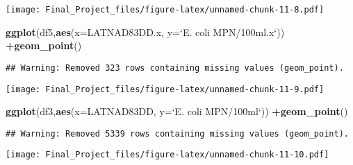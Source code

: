 \documentclass[
]{article}
\newenvironment{Shaded}{\begin{snugshade}}{\end{snugshade}}
\newcommand{\DataTypeTok}[1]{\textcolor[rgb]{0.13,0.29,0.53}{#1}}
\newcommand{\KeywordTok}[1]{\textcolor[rgb]{0.13,0.29,0.53}{\textbf{#1}}}
\newcommand{\NormalTok}[1]{#1}
\newcommand{\OperatorTok}[1]{\textcolor[rgb]{0.81,0.36,0.00}{\textbf{#1}}}
\newcommand{\StringTok}[1]{\textcolor[rgb]{0.31,0.60,0.02}{#1}}
\begin{document}
\texttt{[image: Final\_Project\_files/figure-latex/unnamed-chunk-11-8.pdf]}

\begin{Shaded}
\begin{Highlighting}[]
\KeywordTok{ggplot}\NormalTok{(df5,}\KeywordTok{aes}\NormalTok{(}\DataTypeTok{x=}\NormalTok{LATNAD83DD.x, }\DataTypeTok{y=}\StringTok{`}\DataTypeTok{E. coli MPN/100ml.x}\StringTok{`}\NormalTok{)) }\OperatorTok{+}\KeywordTok{geom_point}\NormalTok{()}
\end{Highlighting}
\end{Shaded}

\begin{verbatim}
## Warning: Removed 323 rows containing missing values (geom_point).
\end{verbatim}

\texttt{[image: Final\_Project\_files/figure-latex/unnamed-chunk-11-9.pdf]}

\begin{Shaded}
\begin{Highlighting}[]
\KeywordTok{ggplot}\NormalTok{(df3,}\KeywordTok{aes}\NormalTok{(}\DataTypeTok{x=}\NormalTok{LATNAD83DD, }\DataTypeTok{y=}\StringTok{`}\DataTypeTok{E. coli MPN/100ml}\StringTok{`}\NormalTok{)) }\OperatorTok{+}\KeywordTok{geom_point}\NormalTok{()}
\end{Highlighting}
\end{Shaded}

\begin{verbatim}
## Warning: Removed 5339 rows containing missing values (geom_point).
\end{verbatim}

\texttt{[image: Final\_Project\_files/figure-latex/unnamed-chunk-11-10.pdf]}
\end{document}
